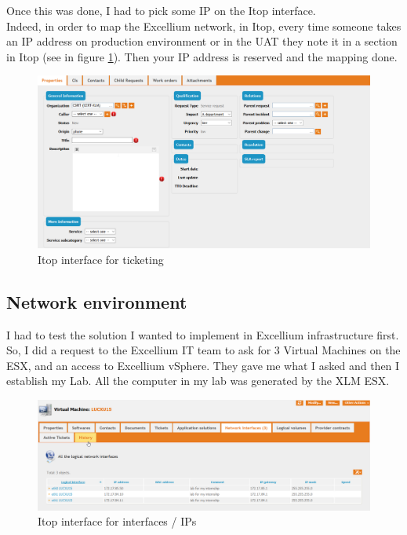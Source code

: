 \documentclass{tnreport}
\begin{document}
Once this was done, I had to pick some IP on the Itop interface.\\
Indeed, in order to map the \gls{Excellium} network, in Itop, every time someone takes an IP address on production environment or in the \gls{UAT} they note it in a section in Itop (see in figure \ref{fig:itopticketing}). Then your IP address is reserved and the mapping done.

\begin{figure}[h!]
  \begin{center}
  \includegraphics[width=\linewidth]{figures/Itop}
  \caption{Itop interface for ticketing}
  \label{fig:itopticketing}
  \end{center}
\end{figure}


\subsection{Network environment}
I had to test the solution I wanted to implement in \gls{Excellium} infrastructure first. So, I did a request to the \gls{Excellium} IT team to ask for 3 Virtual Machines on the ESX, and an access to \gls{Excellium} vSphere. They gave me what I asked and then I establish my Lab. All the computer in my lab was generated by the XLM ESX.


\begin{figure}[h!]
  \begin{center}
  \includegraphics[width=\linewidth]{figures/interfaceItop}
  \caption{Itop interface for interfaces / IPs}
  \label{fig:itopinterface}
  \end{center}
\end{figure}
\end{document}
